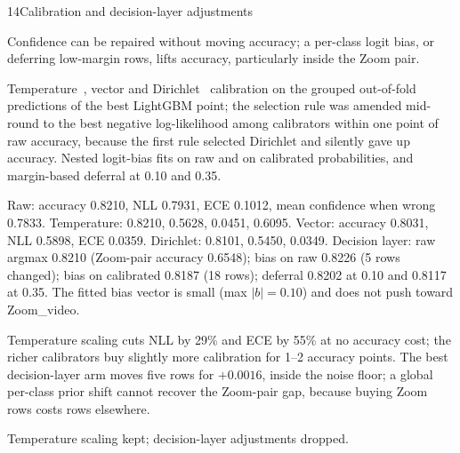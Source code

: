 \begin{explog}{14}{Calibration and decision-layer adjustments}
\item[Hypothesis] Confidence can be repaired without moving accuracy; a per-class logit bias,
or deferring low-margin rows, lifts accuracy, particularly inside the Zoom pair.
\item[Method] Temperature~\cite{guo}, vector and Dirichlet~\cite{kull} calibration on the
grouped out-of-fold predictions of the best LightGBM point; the selection rule was
amended mid-round to the best negative log-likelihood among calibrators within one
point of raw accuracy, because the first rule selected Dirichlet and silently gave
up accuracy. Nested logit-bias fits on raw and on calibrated probabilities, and
margin-based deferral at 0.10 and 0.35.
\item[Result] Raw: accuracy 0.8210, NLL 0.7931, ECE 0.1012, mean confidence when wrong
0.7833. Temperature: 0.8210, 0.5628, 0.0451, 0.6095. Vector: accuracy 0.8031, NLL
0.5898, ECE 0.0359. Dirichlet: 0.8101, 0.5450, 0.0349. Decision layer: raw argmax
0.8210 (Zoom-pair accuracy 0.6548); bias on raw 0.8226 (5 rows changed); bias on
calibrated 0.8187 (18 rows); deferral 0.8202 at 0.10 and 0.8117 at 0.35. The fitted
bias vector is small (max $|b|=0.10$) and does not push toward Zoom\_video.
\item[Inference] Temperature scaling cuts NLL by 29\% and ECE by 55\% at no accuracy cost; the
richer calibrators buy slightly more calibration for 1--2 accuracy points. The best
decision-layer arm moves five rows for $+0.0016$, inside the noise floor; a global
per-class prior shift cannot recover the Zoom-pair gap, because buying Zoom rows
costs rows elsewhere.
\item[Verdict] Temperature scaling kept; decision-layer adjustments dropped.
\end{explog}

